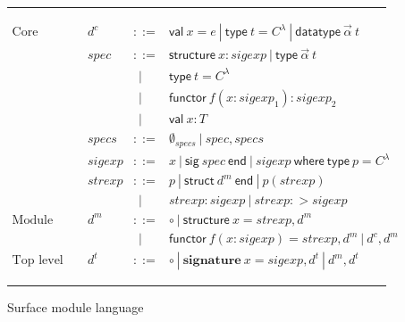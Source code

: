 
\begin{figure}
\hrule
\[
\begin{array}{lrcl}
\textrm{Core declarations} & d^c & ::= & \mathsf{val}~
x=e~|~\mathsf{type}~t=C^\lambda~|~\mathsf{datatype}~\vec{\alpha}~t\\
        & spec & ::= & \mathsf{structure}~x :
        sigexp~|~\mathsf{type}~\vec{\alpha}~t\\
        & & ~~| & \mathsf{type}~t = C^\lambda\\ 
	& & ~~| & \mathsf{functor}~f(x:sigexp_1) : sigexp_2\\
        & & ~~| & \mathsf{val}~x:T\\
        & specs & ::= & \emptyset_{specs}~|~spec, specs\\
	& sigexp & ::= &
        x~|~\mathsf{sig}~spec~\mathsf{end}~|~sigexp~\mathsf{where~
          type}~p=C^\lambda\\
	& strexp & ::= & p~|~\mathsf{struct} ~d^m~\mathsf{end}
        ~|~p(strexp)\\
        & & ~~| & strexp:sigexp~|~strexp:>sigexp\\
\textrm{Module decls}	& d^m & ::= & \circ~|~\mathsf{structure}~x = strexp,
d^m\\
       & & ~~| & \mathsf{functor}
       ~f(x:sigexp)=strexp, d^m~|~d^c, d^m\\
\textrm{Top level decls} & d^t & ::= & \circ~|~\mathbf{signature}~x=sigexp,d^t~|~d^m,d^t

\end{array}
\]
\hrule
\caption{Surface module language}
\label{fig:modlang}
\end{figure}

